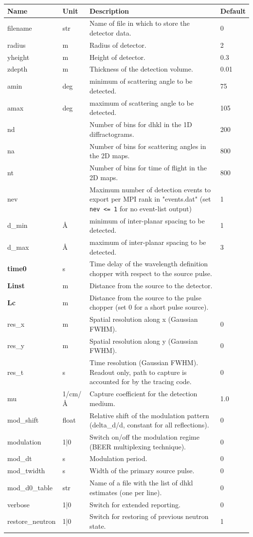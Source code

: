 \begin{longtable}{p{}p{}p{}p{}}
\toprule
\textbf{Name} & \textbf{Unit} & \textbf{Description} & \textbf{Default} \\
\midrule
\endhead
filename & str & Name of file in which to store the detector data. & 0 \\
radius & m & Radius of detector. & 2 \\
yheight & m & Height of detector. & 0.3 \\
zdepth & m & Thickness of the detection volume. & 0.01 \\
amin & deg & minimum of scattering angle to be detected. & 75 \\
amax & deg & maximum of scattering angle to be detected. & 105 \\
nd &  & Number of bins for dhkl in the 1D diffractograms. & 200 \\
na &  & Number of bins for scattering angles in the 2D maps. & 800 \\
nt &  & Number of bins for time of flight in the 2D maps. & 800 \\
nev &  & Maximum number of detection events to export per MPI rank in "events.dat" (set \texttt{nev <= 1} for no event-list output) & 1 \\
d\_min & \AA{} & minimum of inter-planar spacing to be detected. & 1 \\
d\_max & \AA{} & maximum of inter-planar spacing to be detected. & 3 \\
\textbf{time0} & s & Time delay of the wavelength definition chopper with respect to the source pulse. &  \\
\textbf{Linst} & m & Distance from the source to the detector. &  \\
\textbf{Lc} & m & Distance from the source to the pulse chopper (set 0 for a short pulse source). &  \\
res\_x & m & Spatial resolution along x (Gaussian FWHM). & 0 \\
res\_y & m & Spatial resolution along y (Gaussian FWHM). & 0 \\
res\_t & s & Time resolution (Gaussian FWHM). Readout only, path to capture is accounted for by the tracing code. & 0 \\
mu & 1/cm/\AA{} & Capture coefficient for the detection medium. & 1.0 \\
mod\_shift & float & Relative shift of the modulation pattern (delta\_d/d, constant for all reflections). & 0 \\
modulation & 1|0 & Switch on/off the modulation regime (BEER multiplexing technique). & 0 \\
mod\_dt & s & Modulation period. & 0 \\
mod\_twidth & s & Width of the primary source pulse. & 0 \\
mod\_d0\_table & str & Name of a file with the list of dhkl estimates (one per line). & 0 \\
verbose & 1|0 & Switch for extended reporting. & 0 \\
restore\_neutron & 1|0 & Switch for restoring of previous neutron state. & 1 \\
\bottomrule
\end{longtable}

